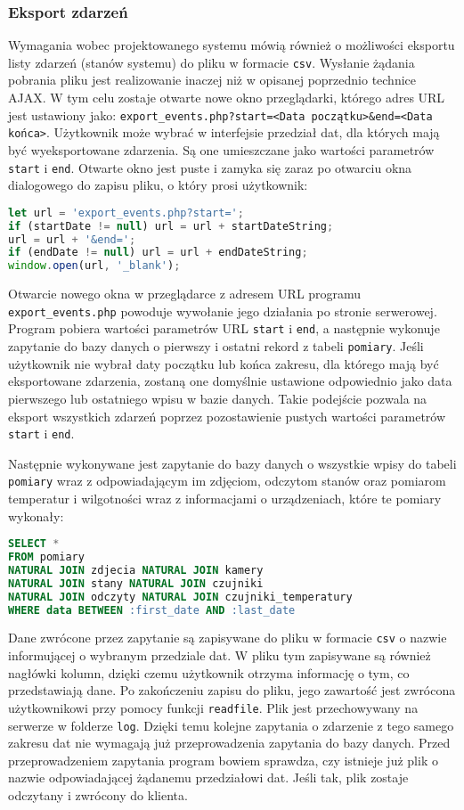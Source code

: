 \documentclass[a4paper,11pt,twoside]{article}
\begin{document}
\subsubsection{Eksport zdarzeń}
Wymagania wobec projektowanego systemu mówią również o możliwości eksportu listy zdarzeń (stanów systemu) do pliku w formacie \texttt{csv}. Wysłanie żądania pobrania pliku jest realizowanie inaczej niż w opisanej poprzednio technice AJAX. W tym celu zostaje otwarte nowe okno przeglądarki, którego adres URL jest ustawiony jako: \texttt{export{\_}events.php?\linebreak start=<Data początku>{\&}end=<Data końca>}. Użytkownik może wybrać w interfejsie przedział dat, dla których mają być wyeksportowane zdarzenia. Są one umieszczane jako wartości parametrów \texttt{start} i \texttt{end}. Otwarte okno jest puste i zamyka się zaraz po otwarciu okna dialogowego do zapisu pliku, o który prosi użytkownik:
\begin{lstlisting}[language=JavaScript]
let url = 'export_events.php?start=';
if (startDate != null) url = url + startDateString;
url = url + '&end=';
if (endDate != null) url = url + endDateString;
window.open(url, '_blank');
\end{lstlisting}

Otwarcie nowego okna w przeglądarce z adresem URL programu \texttt{export{\_}events.php} powoduje wywołanie jego działania po stronie serwerowej. Program pobiera wartości parametrów URL \texttt{start} i \texttt{end}, a następnie wykonuje zapytanie do bazy danych o pierwszy i ostatni rekord z tabeli \texttt{pomiary}. Jeśli użytkownik nie wybrał daty początku lub końca zakresu, dla którego mają być eksportowane zdarzenia, zostaną one domyślnie ustawione odpowiednio jako data pierwszego lub ostatniego wpisu w bazie danych. Takie podejście pozwala na eksport wszystkich zdarzeń poprzez pozostawienie pustych wartości parametrów \texttt{start} i \texttt{end}.

Następnie wykonywane jest zapytanie do bazy danych o wszystkie wpisy do tabeli \texttt{pomiary} wraz z odpowiadającym im zdjęciom, odczytom stanów oraz pomiarom temperatur i wilgotności wraz z informacjami o urządzeniach, które te pomiary wykonały:
\begin{lstlisting}[language=SQL]
SELECT *
FROM pomiary 
NATURAL JOIN zdjecia NATURAL JOIN kamery
NATURAL JOIN stany NATURAL JOIN czujniki
NATURAL JOIN odczyty NATURAL JOIN czujniki_temperatury
WHERE data BETWEEN :first_date AND :last_date
\end{lstlisting}
Dane zwrócone przez zapytanie są zapisywane do pliku w formacie \texttt{csv} o nazwie informującej o wybranym przedziale dat. W pliku tym zapisywane są również nagłówki kolumn, dzięki czemu użytkownik otrzyma informację o tym, co przedstawiają dane. Po zakończeniu zapisu do pliku, jego zawartość jest zwrócona użytkownikowi przy pomocy funkcji \texttt{readfile}. Plik jest przechowywany na serwerze w folderze \texttt{log}. Dzięki temu kolejne zapytania o zdarzenie z tego samego zakresu dat nie wymagają już przeprowadzenia zapytania do bazy danych. Przed przeprowadzeniem zapytania program bowiem sprawdza, czy istnieje już plik o nazwie odpowiadającej żądanemu przedziałowi dat. Jeśli tak, plik zostaje odczytany i zwrócony do klienta.
\end{document}
